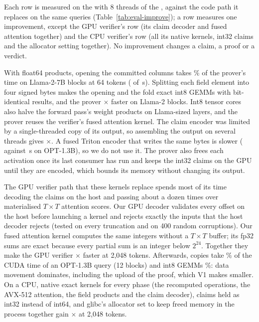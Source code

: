 Each row is measured on the \PlatformGpu{} with 8 threads of the \PlatformCpu{}, against the code path it
replaces on the same queries (Table~\ref{tab:eval-improve}); a row measures one improvement, except the GPU
verifier's row (its claim decoder and fused attention together) and the CPU verifier's row (all its native
kernels, int32 claims and the allocator setting together). No improvement changes a claim, a proof or a
verdict.

 With float64 products, opening the committed columns takes \ImproveOpenShare{}\% of the prover's time
on Llama-2-7B blocks at 64 tokens (\ImproveOpenFloat{} of \ImproveProveFloat{}\,s). Splitting each field element into four signed bytes makes the
opening and the fold exact int8 GEMMs with bit-identical results, and the prover \ImproveOpenRange{}$\times$
faster on Llama-2 blocks. Int8 tensor cores also halve the forward pass's weight products on
Llama-sized layers, and the prover reuses the verifier's fused attention kernel. The claim encoder
was limited by a single-threaded copy of its output, so assembling the output on several threads
gives \ImproveEncodeRange{}$\times$. A fused Triton encoder that writes the same bytes is slower
(\ImproveFusedEncoder{} against \ImproveThreadedEncoder{}\,s on OPT-1.3B), so we do not use it. The prover
also frees each activation once its last consumer has run and keeps the int32 claims on the GPU until they
are encoded, which bounds its memory without changing its output.

 The GPU verifier path that these kernels replace spends most of its time decoding
the claims on the host and passing about a dozen times over materialised $T\times T$ attention
scores. Our GPU decoder validates every offset on the host before launching a kernel and rejects
exactly the inputs that the host decoder rejects (tested on every truncation and on 400 random
corruptions). Our fused
attention kernel computes the same integers without a $T\times T$ buffer; its fp32 sums are exact
because every partial sum is an integer below $2^{24}$. Together they make the GPU verifier
\ImproveGpuvRange{}$\times$ faster at 2{,}048 tokens. Afterwards, copies take \ProfileCopies{}\% of the CUDA time of an
OPT-1.3B query (12 blocks) and int8 GEMMs \ProfileIntMM{}\%: data movement dominates, including the upload of
the proof, which V1 makes smaller. On a CPU, native exact kernels for every phase (the recomputed operations, the AVX-512 attention, the
field products and the claim decoder), claims held as int32 instead of int64, and glibc's allocator set to
keep freed memory in the process together gain \ImproveCpuv{}$\times$ at 2{,}048 tokens.

